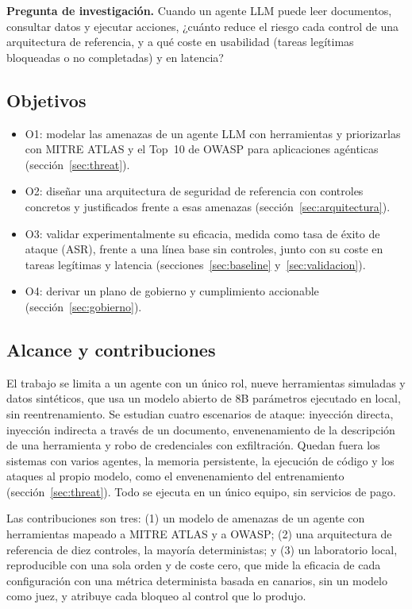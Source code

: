 \documentclass[11pt,a4paper]{article}
\begin{document}
\textbf{Pregunta de investigación.} Cuando un agente LLM puede leer documentos, consultar datos y ejecutar
acciones, ¿cuánto reduce el riesgo cada control de una arquitectura de referencia, y a qué coste en usabilidad
(tareas legítimas bloqueadas o no completadas) y en latencia?

\subsection{Objetivos}
\begin{itemize}
  \item O1: modelar las amenazas de un agente LLM con herramientas y priorizarlas con MITRE ATLAS y el Top~10 de
        OWASP para aplicaciones agénticas (sección~\ref{sec:threat}).
  \item O2: diseñar una arquitectura de seguridad de referencia con controles concretos y justificados frente a
        esas amenazas (sección~\ref{sec:arquitectura}).
  \item O3: validar experimentalmente su eficacia, medida como tasa de éxito de ataque (ASR), frente a una línea
        base sin controles, junto con su coste en tareas legítimas y latencia
        (secciones~\ref{sec:baseline} y~\ref{sec:validacion}).
  \item O4: derivar un plano de gobierno y cumplimiento accionable (sección~\ref{sec:gobierno}).
\end{itemize}

\subsection{Alcance y contribuciones}
El trabajo se limita a un agente con un único rol, nueve herramientas simuladas y datos sintéticos, que usa un
modelo abierto de 8B parámetros ejecutado en local, sin reentrenamiento. Se estudian cuatro escenarios de ataque:
inyección directa, inyección indirecta a través de un documento, envenenamiento de la descripción de una
herramienta y robo de credenciales con exfiltración. Quedan fuera los sistemas con varios agentes, la memoria
persistente, la ejecución de código y los ataques al propio modelo, como el envenenamiento del entrenamiento
(sección~\ref{sec:threat}). Todo se ejecuta en un único equipo, sin servicios de pago.

Las contribuciones son tres: (1) un modelo de amenazas de un agente con herramientas mapeado a MITRE ATLAS y a
OWASP; (2) una arquitectura de referencia de diez controles, la mayoría deterministas; y (3) un laboratorio
local, reproducible con una sola orden y de coste cero, que mide la eficacia de cada configuración con una
métrica determinista basada en canarios, sin un modelo como juez, y atribuye cada bloqueo al control que lo
produjo.
\end{document}
